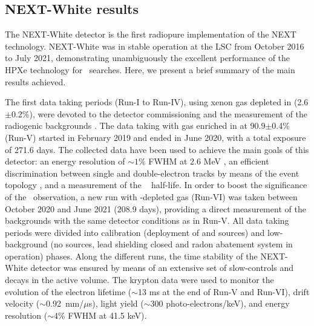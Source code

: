\subsection{NEXT-White results}
\label{sec.new}


The NEXT-White detector is the first radiopure implementation of the NEXT technology. NEXT-White \cite{NEXT:2018rgj} was in stable operation at the LSC from October 2016 to July 2021, demonstrating unambiguously the excellent performance of the HPXe technology for \bbonu\ searches. Here, we present a brief summary of the main results achieved. 


The first data taking periods (Run-I to Run-IV), using xenon gas depleted in  (2.6$\pm$0.2\%), were devoted to the detector commissioning and the measurement of the radiogenic backgrounds \cite{NEXT:2018zho,Novella:2019cne}. The data taking with gas enriched in  at 90.9$\pm$0.4\% (Run-V) started in February 2019 and ended in June 2020, with a total exposure of 271.6 days. The collected data have been used to achieve the main goals of this detector: an energy resolution of $\sim1\%$ FWHM at 2.6 MeV \cite{Renner:2019pfe}, an efficient discrimination between single and double-electron tracks by means of the event topology \cite{Ferrario:2019kwg,NEXT:2020jmz,NEXT:2021pjq}, and a measurement of the  \bbtnu~ half-life. In order to boost the significance of the \bbtnu ~observation, a new run with -depleted gas (Run-VI) was taken between October 2020 and June 2021 (208.9 days), providing a direct measurement of the backgrounds with the same detector conditions as in Run-V. All data taking periods were divided into calibration (deployment of  and  sources) and low-background (no sources, lead shielding closed and radon abatement system in operation) phases. Along the different runs, the time stability of the NEXT-White detector was ensured by means of an extensive set of slow-controls and  decays in the active volume. The krypton data were used to monitor the evolution of the electron lifetime ($\sim$13 ms at the end of Run-V and Run-VI), drift velocity ($\sim$0.92~mm/$\mu$s), light yield ($\sim$300 photo-electrons/keV), and energy resolution ($\sim$4\% FWHM at 41.5 keV).      


